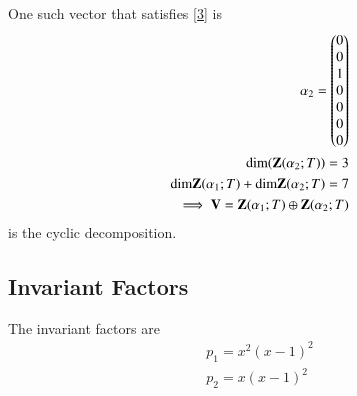 \documentclass[journal,12pt,twocolumn]{IEEEtran}
\begin{document}
  One such vector that satisfies \eqref{3} is
  \begin{align}
  \alpha_2=\begin{pmatrix}0\\0\\1\\0\\0\\0\\0\end{pmatrix} \\
   \text{dim}(\mathbf{Z}(\alpha_2;T))=3\\
   \text{dim}\mathbf{Z}(\alpha_1;T)+\text{dim}\mathbf{Z}(\alpha_2;T)=7\\
  \implies \mathbf{V}=\mathbf{Z}(\alpha_1;T)\oplus \mathbf{Z}(\alpha_2;T)
\end{align}
is the cyclic decomposition.
\subsection{Invariant Factors}
The invariant factors are 
\begin{align}
   p_1=x^2(x-1)^2\\
    p_2=x(x-1)^2
\end{align}
\end{document}
